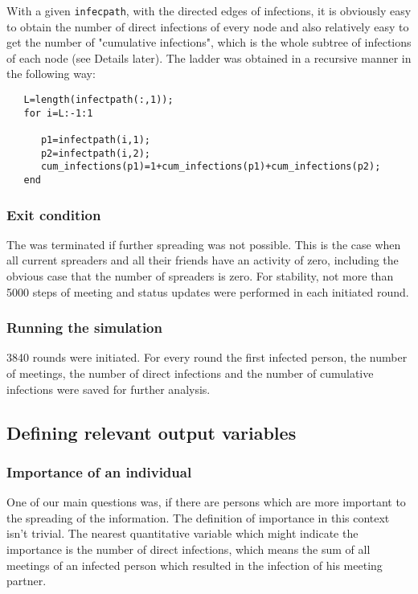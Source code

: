 With a given \texttt{infecpath}, with the directed edges of infections, it is obviously easy to obtain the number of direct infections of every node and also relatively easy to get the number of "cumulative infections", which is the whole subtree of infections of each node (see Details later). The ladder was obtained in a recursive manner in the following way:

\begin{lstlisting} 
   L=length(infectpath(:,1));
   for i=L:-1:1
      
      p1=infectpath(i,1);
      p2=infectpath(i,2);
      cum_infections(p1)=1+cum_infections(p1)+cum_infections(p2);
   end

\end{lstlisting}


\subsubsection{Exit condition}

The  was terminated if further spreading was not possible. This is the case when all current spreaders and all their friends have an activity of zero, including the obvious case that the number of spreaders is zero. For stability, not more than 5000 steps of meeting and status updates were performed in each initiated round.

\subsubsection{Running the simulation}
3840 rounds were initiated. For every round the first infected person, the number of meetings, the number of direct infections and the number of cumulative infections were saved for further analysis.

\subsection{Defining relevant output variables}

\subsubsection{Importance of an individual}

One of our main questions was, if there are persons which are more important to the spreading of the information. The definition of importance in this context isn't trivial. The nearest quantitative variable which might indicate the importance is the number of direct infections, which means the sum of all meetings of an infected person which resulted in the infection of his meeting partner.



